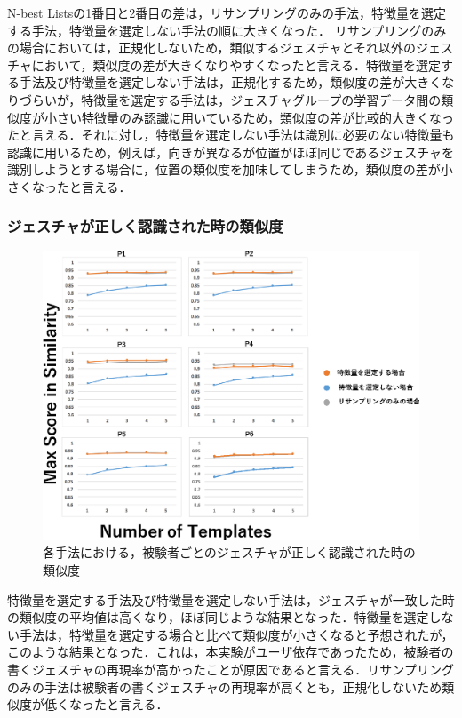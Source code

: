 N-best Listsの1番目と2番目の差は，リサンプリングのみの手法，特徴量を選定する手法，特徴量を選定しない手法の順に大きくなった．
リサンプリングのみの場合においては，正規化しないため，類似するジェスチャとそれ以外のジェスチャにおいて，類似度の差が大きくなりやすくなったと言える．特徴量を選定する手法及び特徴量を選定しない手法は，正規化するため，類似度の差が大きくなりづらいが，特徴量を選定する手法は，ジェスチャグループの学習データ間の類似度が小さい特徴量のみ認識に用いているため，類似度の差が比較的大きくなったと言える．それに対し，特徴量を選定しない手法は識別に必要のない特徴量も認識に用いるため，例えば，向きが異なるが位置がほぼ同じであるジェスチャを識別しようとする場合に，位置の類似度を加味してしまうため，類似度の差が小さくなったと言える．

\subsubsection{ジェスチャが正しく認識された時の類似度}
\begin{figure}[!h]
\centering
\includegraphics[width=1.0\columnwidth]{img/pre_sim.eps}
\caption{各手法における，被験者ごとのジェスチャが正しく認識された時の類似度}
\label{fig:rare_rec}
\end{figure}

特徴量を選定する手法及び特徴量を選定しない手法は，ジェスチャが一致した時の類似度の平均値は高くなり，ほぼ同じような結果となった．特徴量を選定しない手法は，特徴量を選定する場合と比べて類似度が小さくなると予想されたが，このような結果となった．これは，本実験がユーザ依存であったため，被験者の書くジェスチャの再現率が高かったことが原因であると言える．リサンプリングのみの手法は被験者の書くジェスチャの再現率が高くとも，正規化しないため類似度が低くなったと言える．

